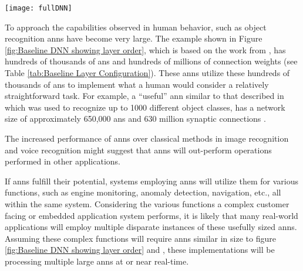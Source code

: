 \begin{sidewaysfigure}[h]
    \bigskip

      \begin{minipage}{1\textwidth}
        \centering
        \texttt{[image: fullDNN]}
        \captionsetup{justification=centering, skip=15pt}
        \label{fig:Baseline DNN showing layer order}
      \end{minipage}
  
\end{sidewaysfigure}



\iffalse
\begin{sidewaysfigure}[h]
\centering
\texttt{[image: fullDNN]}
\captionsetup{justification=centering, skip=15pt}
\caption{DNN showing layer order \cite{krizhevsky2012imagenet}}
\label{fig:DNN showing layer order}
\end{sidewaysfigure}
\fi

To approach the capabilities observed in human behavior, such as object recognition \ac{ann}s have become very large. The example shown in Figure \ref{fig:Baseline DNN showing layer order}, which is based on the work from \cite{krizhevsky2012imagenet}, has hundreds of thousands of \acp{an} and hundreds of millions of connection weights (see Table \ref{tab:Baseline Layer Configuration}).
These \acp{ann} utilize these hundreds of thousands of \acp{an} to implement what a human would consider a relatively straightforward task.
For example, a ``useful'' \ac{ann} similar to that described in \cite{krizhevsky2012imagenet} which was used to recognize up to 1000 different object classes, has a network size of approximately 650,000 \acp{an} and 630 million synaptic connections \cite{krizhevsky2012imagenetPreso}. 

The increased performance of \ac{ann}s over classical methods in image recognition and voice recognition might suggest that \ac{ann}s will out-perform operations performed in other applications.
\iffalse There is reason to believe that \acp{ann} will replace various functions in existing systems. \fi

If \acp{ann} fulfill their potential, systems employing \ac{ann}s will utilize them for various functions, such as engine monitoring, anomaly detection, navigation, etc., all within the same system.
Considering the various functions a complex customer facing or embedded application system performs, it is likely that many real-world applications will employ multiple disparate instances of these usefully sized \acp{ann}.
Assuming these complex functions will require \ac{ann}s similar in size to figure \ref{fig:Baseline DNN showing layer order} and \cite{krizhevsky2012imagenet}, these implementations will be processing multiple large \ac{ann}s at or near real-time.

